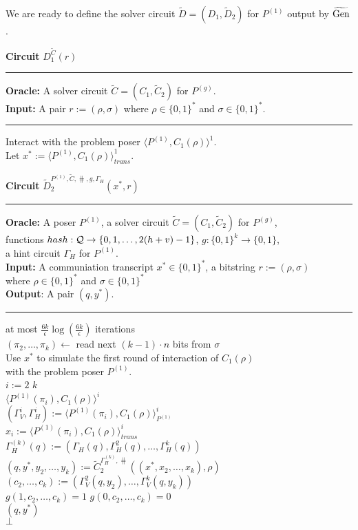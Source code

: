 %
We are ready to define the solver circuit $\widetilde{D} = (D_1, \widetilde{D}_2)$ for $P^{(1)}$ output by $\widetilde{\operatorname{\text{Gen}}}$.
%
\begin{codeblock}
  \textbf{Circuit} $D_1^{\widetilde{C}}(r)$
  \medskip \hrule
  \textbf{Oracle:} A solver circuit $\widetilde{C} = (C_1, \widetilde{C}_2)$ for $P^{(g)}$.\\
  \textbf{Input:} A pair $r := (\rho, \sigma)$ where $ \rho \in \{0,1\}^{*}$ and $\sigma \in \{0,1\}^{*}$.
  \medskip\hrule
  Interact with the problem poser $\langle P^{(1)}, C_1(\rho) \rangle^1$. \\
  Let $x^* := \langle P^{(1)}, C_1(\rho) \rangle^1_{\mathit{trans}}$.
\end{codeblock}
%
\begin{codeblock}
  \textbf{Circuit} $\widetilde{D}_2^{P^{(1)}, \widetilde{C}, \hash, g,  \Gamma_H}(x^*, r)$
  \medskip \hrule
  \textbf{Oracle:} A poser $P^{(1)}$, a solver circuit $\widetilde{C} = (C_1, \widetilde{C}_2)$ for $P^{(g)}$, \\
  \IndII functions $hash : \mathcal{Q} \rightarrow \{0,1, \dots, 2(h+v)-1\}$, $g:\{0,1\}^k \rightarrow \{0,1\}$, \\
  \IndII a hint circuit $\Gamma_H$ for $P^{(1)}$. \\
  \textbf{Input:} A communiation transcript $x^* \in \{0,1\}^{*}$, a bitstring $r := (\rho, \sigma)$ \\
  \IndII where $\rho \in \{0,1\}^{*}$ and $\sigma \in \{0,1\}^{*}$\\
  \textbf{Output}: A pair $(q, y^*)$.
  \medskip \hrule
  \For at most $\frac{6k}{\epsilon} \log(\frac{6k}{\epsilon})$ iterations \Do \\
  \IndI $(\pi_2, \dots, \pi_k) \leftarrow$ read next $(k-1)\cdot n$ bits from $\sigma$ \\
  \IndI Use $x^*$ to simulate the first round of interaction of $C_1(\rho)$ \\
  \IndI with the problem poser $P^{(1)}$.\\
  \IndI \For $i:=2$ \To $k$ \Do \\
  \IndII \Run $\langle P^{(1)}(\pi_i), C_1(\rho)\rangle^i$ \\
  \IndIII $(\Gamma_V^{i}, \Gamma_H^{i}) := \langle P^{(1)}(\pi_i), C_1(\rho) \rangle^i_{P^{(1)}}$ \\
  \IndIII $x_i := \langle P^{(1)}(\pi_i), C_1(\rho) \rangle^i_{\mathit{trans}}$ \\
  \IndI $\Gamma_H^{(k)}(q) := (\Gamma_H(q), \Gamma_H^{2}(q), \dots, \Gamma_H^{k}(q))$ \\
  \IndI $(q, y^*, y_2, \dots, y_k) := \widetilde{C}_2^{\Gamma_H^{(k)}, \hash}((x^*, x_2, \dotsc, x_k), \rho)$\\
  \IndI $(c_2, \dots, c_k) := (\Gamma_V^2(q, y_2), \dotsc, \Gamma_V^{k}(q, y_k))$ \\
  \IndI \If $g(1, c_{2}, \dots, c_k) = 1$ \And $g(0,c_{2}, \dots, c_k) = 0$ \Then \\
  \IndII \Return $(q, y^*)$ \\
  \Return $\bot$
%
\end{codeblock}
